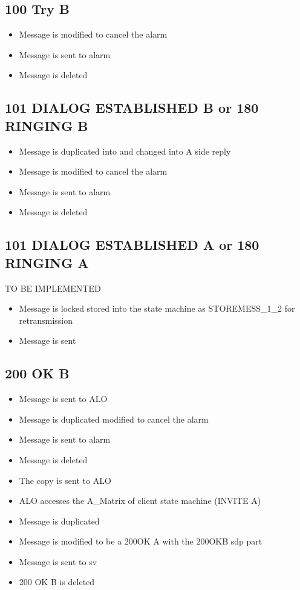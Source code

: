 \documentclass[a4paper]{report}
\begin{document}
\subsection{100 Try B}
\begin {itemize}
\item Message is modified to cancel the alarm
\item Message is sent to alarm
\item Message is deleted
\end{itemize}

\subsection{101 DIALOG ESTABLISHED B or 180 RINGING B}
\begin {itemize}
\item Message is duplicated into and changed into A side reply
\item Message is modified to cancel the alarm
\item Message is sent to alarm
\item Message is deleted
\end{itemize}

\subsection{101 DIALOG ESTABLISHED A or 180 RINGING A}
TO BE IMPLEMENTED
\begin {itemize}
\item Message is locked stored into the state machine as STOREMESS\_1\_2 for retransmission 
\item Message is sent
\end{itemize}

\subsection{200 OK B}
\begin {itemize}
\item Message is sent to ALO
\item Message is duplicated modified to cancel the alarm
\item Message is sent to alarm
\item Message is deleted
\item The copy is sent to ALO
\item ALO accesses the A\_Matrix of client state machine (INVITE A)
\item Message is duplicated
\item Message is modified to be a 200OK A with the 200OKB sdp part
\item Message is sent to sv
\item 200 OK B is deleted
\end{itemize}
\end{document}
